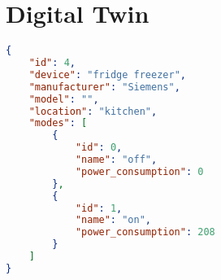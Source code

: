 \chapter{Digital Twin}\label{ch:digital_twin}

\begin{lstlisting}[language=json,caption={JSON file describing the fridge},label=fridge_json,float,floatplacement=H]
{
    "id": 4,
    "device": "fridge freezer",
    "manufacturer": "Siemens",
    "model": "",
    "location": "kitchen",
    "modes": [
        {
            "id": 0,
            "name": "off",
            "power_consumption": 0
        },
        {
            "id": 1,
            "name": "on",
            "power_consumption": 208
        }
    ]
}
\end{lstlisting}
